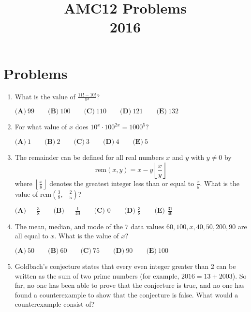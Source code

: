 \documentclass{article}
\title{AMC12 Problems \\ 2016}
\date{}
\begin{document}
\maketitle\thispagestyle{fancy}\newpage\section*{Problems}\begin{enumerate}[label=\arabic*., itemsep=0.5em]\item What is the value of $\frac{11!-10!}{9!}$?

$\textbf{(A)}\ 99\qquad\textbf{(B)}\ 100\qquad\textbf{(C)}\ 110\qquad\textbf{(D)}\ 121\qquad\textbf{(E)}\ 132$\par \vspace{0.5em}\item For what value of $x$ does $10^x \cdot 100^{2x} = 1000^5$?

$\textbf{(A)}\ 1\qquad\textbf{(B)}\ 2\qquad\textbf{(C)}\ 3\qquad\textbf{(D)}\ 4\qquad\textbf{(E)}\ 5$\par \vspace{0.5em}\item The remainder can be defined for all real numbers $x$ and $y$ with $y \neq 0$ by 
\begin{equation*}
\text{rem} (x ,y)=x-y\left \lfloor \frac{x}{y} \right \rfloor
\end{equation*}
where $\left \lfloor \tfrac{x}{y} \right \rfloor$ denotes the greatest integer less than or equal to $\tfrac{x}{y}$. What is the value of $\text{rem} (\tfrac{3}{8}, -\tfrac{2}{5} )$?

$\textbf{(A) } -\frac{3}{8} \qquad \textbf{(B) } -\frac{1}{40} \qquad \textbf{(C) } 0 \qquad \textbf{(D) } \frac{3}{8} \qquad \textbf{(E) } \frac{31}{40}$\par \vspace{0.5em}\item The mean, median, and mode of the $7$ data values $60, 100, x, 40, 50, 200, 90$ are all equal to $x$. What is the value of $x$?

$\textbf{(A)}\ 50\qquad\textbf{(B)}\ 60\qquad\textbf{(C)}\ 75\qquad\textbf{(D)}\ 90\qquad\textbf{(E)}\ 100$\par \vspace{0.5em}\item Goldbach's conjecture states that every even integer greater than 2 can be written as the sum of two prime numbers (for example, $2016=13+2003$). So far, no one has been able to prove that the conjecture is true, and no one has found a counterexample to show that the conjecture is false. What would a counterexample consist of?


\end{enumerate}
\end{document}
